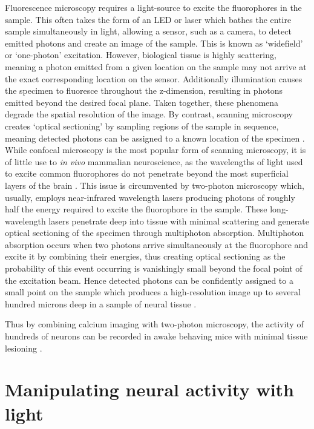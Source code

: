 Fluorescence microscopy \cite{lichtman_fluorescence_2005} requires a light-source to excite the fluorophores in the sample. This often takes the form of an LED or laser which bathes the entire sample simultaneously in light, allowing a sensor, such as a camera, to detect emitted photons and create an image of the sample. This is known as ‘widefield’ or ‘one-photon’ excitation. However, biological tissue is highly scattering, meaning a photon emitted from a given location on the sample may not arrive at the exact corresponding location on the sensor. Additionally illumination causes the specimen to fluoresce throughout the z-dimension, resulting in photons emitted beyond the desired focal plane. Taken together, these phenomena degrade the spatial resolution of the image. By contrast, scanning microscopy creates ‘optical sectioning’ by sampling regions of the sample in sequence, meaning detected photons can be assigned to a known location of the specimen \cite{lichtman_fluorescence_2005}. While confocal microscopy \cite{nwaneshiudu_introduction_2012} is the most popular form of scanning microscopy, it is of little use to \textit{in vivo} mammalian neuroscience, as the wavelengths of light used to excite common fluorophores do not penetrate beyond the most superficial layers of the brain \cite{helmchen_deep_2005}. This issue is circumvented by two-photon microscopy which, usually, employs near-infrared wavelength lasers producing photons of roughly half the energy required to excite the fluorophore in the sample. These long-wavelength lasers penetrate deep into tissue with minimal scattering and generate optical sectioning of the specimen through multiphoton absorption. Multiphoton absorption occurs when two photons arrive simultaneously at the fluorophore and excite it by combining their energies, thus creating optical sectioning as the probability of this event occurring is vanishingly small beyond the focal point of the excitation beam. Hence detected photons can be confidently assigned to a small point on the sample which produces a high-resolution image up to several hundred microns deep in a sample of neural tissue \cite{helmchen_deep_2005}.

Thus by combining calcium imaging with two-photon microscopy, the activity of hundreds of neurons can be recorded in awake behaving mice with minimal tissue lesioning \cite{helmchen_vivo_1999, stosiek_vivo_2003, lutcke_steady_2013, driscoll_dynamic_2017, stringer_spontaneous_2019}.

\section{Manipulating neural activity with light}

